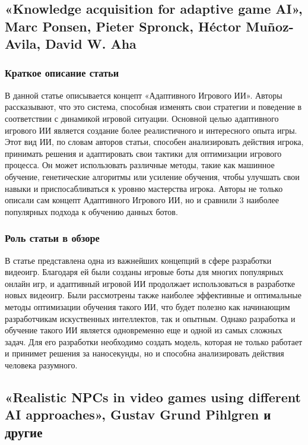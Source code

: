 \documentclass[14pt]{article}
\begin{document}
\subsection{«Knowledge acquisition for adaptive game AI», Marc Ponsen, Pieter Spronck, Héctor Muñoz-Avila, David W. Aha }
\subsubsection{Краткое описание статьи}
В данной статье описывается концепт «Адаптивного Игрового ИИ». Авторы рассказывают, что это система, способная изменять свои стратегии и поведение в соответствии с динамикой игровой ситуации. Основной целью адаптивного игрового ИИ является создание более реалистичного и интересного опыта игры. Этот вид ИИ, по словам авторов статьи, способен анализировать действия игрока, принимать решения и адаптировать свои тактики для оптимизации игрового процесса. Он может использовать различные методы, такие как машинное обучение, генетические алгоритмы или усиление обучения, чтобы улучшать свои навыки и приспосабливаться к уровню мастерства игрока. Авторы не только описали сам концепт Адаптивного Игрового ИИ, но и сравнили 3 наиболее популярных подхода к обучению данных ботов.

\subsubsection{Роль статьи в обзоре}
В статье представлена одна из важнейших концепций в сфере разработки видеоигр. Благодаря ей были созданы игровые боты для многих популярных онлайн игр, и адаптивный игровой ИИ продолжает использоваться в разработке новых видеоигр. Были рассмотрены также наиболее эффективные и оптимальные методы оптимизации обучения такого ИИ, что будет полезно как начинающим разработчикам искуственных интеллектов, так и опытным. Однако разработка и обучение такого ИИ является одновременно еще и одной из самых сложных задач. Для его разработки необходимо создать модель, которая не только работает и принимет решения за наносекунды, но и способна анализировать действия человека разумного. 

\subsection{«Realistic NPCs in video games using different AI approaches», Gustav Grund Pihlgren и другие}
\end{document}
